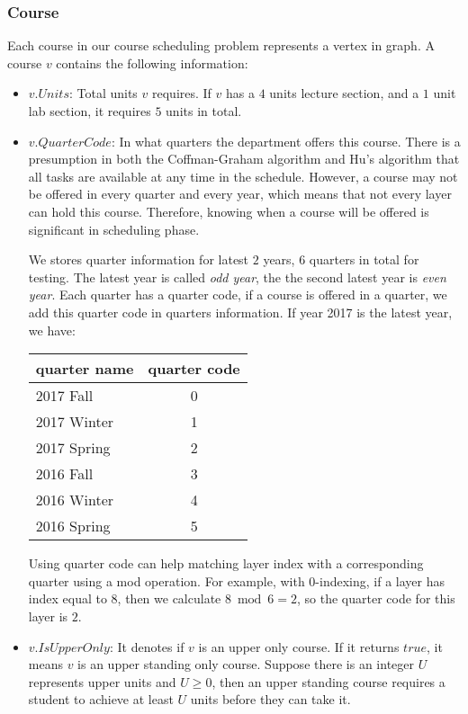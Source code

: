 \documentclass[letterpaper,12pt]{article}
\theoremstyle{definition}
\begin{document}
\subsubsection{Course}
Each course in our course scheduling problem represents a vertex in graph. A course $v$ contains the following information:
\begin{itemize}
    \item $v.Units$: Total units $v$ requires. If $v$ has a $4$ units lecture section, and a $1$ unit lab section, it requires $5$ units in total.
    \item $v.QuarterCode$: In what quarters the department offers this course. There is a presumption in both the Coffman-Graham algorithm and Hu's algorithm that all tasks are available at any time in the schedule. However, a course may not be offered in every quarter and every year, which means that not every layer can hold this course. Therefore, knowing when a course will be offered is significant in scheduling phase.
    
    We stores quarter information for latest $2$ years, $6$ quarters in total for testing. The latest year is called \textit{odd year}, the the second latest year is \textit{even year}. Each quarter has a quarter code, if a course is offered in a quarter, we add this quarter code in quarters information. If year 2017 is the latest year, we have:
    \begin{center}
    \begin{tabular}{ |l|c| } 
         \hline
         quarter name & quarter code \\
         \hline
         2017 Fall & 0 \\ 
         2017 Winter & 1 \\ 
         2017 Spring & 2 \\ 
         2016 Fall & 3 \\
         2016 Winter & 4 \\
         2016 Spring & 5 \\
         \hline
    \end{tabular}
    \end{center}
    Using quarter code can help matching layer index with a corresponding quarter using a mod operation. For example, with 0-indexing, if a layer has index equal to $8$, then we calculate $8 \bmod 6 = 2$, so the quarter code for this layer is $2$. 
    \item $v.IsUpperOnly$: It denotes if $v$ is an upper only course. If it returns $true$, it means $v$ is an upper standing only course. Suppose there is an integer $U$ represents upper units and $U \geq 0$, then an upper standing course requires a student to achieve at least $U$ units before they can take it. 
    

\end{itemize}
\end{document}
